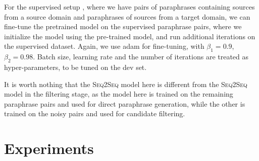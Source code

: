 \documentclass[11pt,a4paper]{article}
\newcommand{\sts}{{{\textsc{Seq2Seq}}}\xspace}
\begin{document}
 For the supervised setup  \cite{witteveen2019paraphrasing,kazemnejad-etal-2020-paraphrase,hegde2020unsupervised}, where we have 
 pairs of paraphrases containing
  sources from a source domain and paraphrases of sources from a target domain,
  we can fine-tune the pretrained model on the supervised paraphrase pairs, where we initialize the model using the 
pre-trained
 model, and run additional iterations on the supervised dataset. 
Again, we use adam  \citep{kingma2014adam} for fine-tuning, with $\beta_1=0.9$,
$\beta_2=0.98$. Batch size, learning rate 
and the number of iterations
are treated as hyper-parameters, to be tuned on the dev set. 



It is worth nothing that the \sts model here is different from the \sts model in the filtering stage, as the model here is
trained on the remaining paraphrase pairs and 
 used for direct paraphrase generation, while the other is trained on the noisy pairs and used for candidate filtering. 

\section{Experiments}
\end{document}
